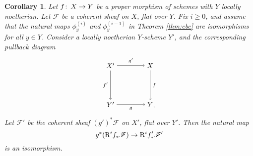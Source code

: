 \documentclass{gtpart}
\newtheorem{cor}[thm]{Corollary}
\theoremstyle{definition}
\theoremstyle{remark}
\def\co{\colon\thinspace}
\newcommand{\CF}{{\mathscr{F}}}
\newcommand{\rt}{{\rm R}}
\newcommand{\f}{\phi}
\begin{document}
\begin{cor}
\label{cor:basechange}
 Let $f \co X \to Y$ be a proper morphism of schemes with $Y$ locally noetherian.  
 Let $\CF$ be a coherent sheaf on $X$, flat over $Y$.  
 Fix $i \geq 0$, and assume that the natural maps $\f_y^{(i)}$ and $\f_y^{(i-1)}$ in Theorem \ref{thm:cbc} are isomorphisms for all $y \in Y$.  
 Consider a locally noetherian $Y$-scheme $Y'$, and the corresponding pullback diagram 
 \begin{equation}
 \label{pullback}
  \begin{tikzpicture}[baseline=(current bounding box.center)]
          \node (LT) at (0, 2) {$X'$}; 
          \node (RT) at (2, 2) {$X$}; 
          \node (LB) at (0, 0) {$Y'$}; 
          \node (RB) at (2, 0) {$Y$}; 
          \node at (2.2, -0.125) {.}; 
          \draw [->] (LT) -- node [above] {$\scriptstyle g'$} (RT); 
          \draw [->] (LT) -- node [left] {$\scriptstyle f'$} (LB); 
          \draw [->] (RT) -- node [right] {$\scriptstyle f$} (RB); 
          \draw [->] (LB) -- node [below] {$\scriptstyle g$} (RB); 
  \end{tikzpicture}
 \end{equation}
 Let $\CF'$ be the coherent sheaf $(g')^* \CF$ on $X'$, flat over $Y'$.  
 Then the natural map 
 \[
  g^*(\rt^i f_* \CF) \to \rt^i f'_* \CF' 
 \]
 is an isomorphism.  
\end{cor}
\end{document}
